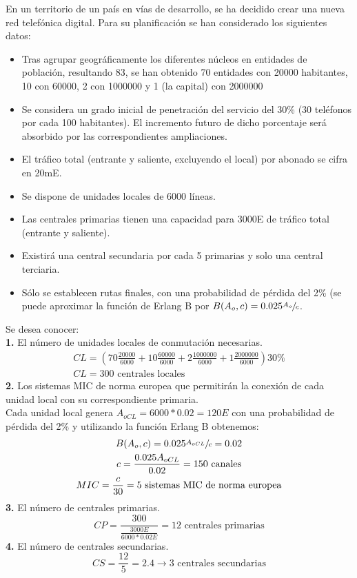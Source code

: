 \begin{exercise}[6]
En un territorio de un país en vías de desarrollo, se ha decidido crear una nueva red telefónica digital. Para su planificación se han considerado los siguientes datos:
\begin{itemize}
\item Tras agrupar geográficamente los diferentes núcleos en entidades de población, resultando 83, se han obtenido 70 entidades  con 20000 habitantes, 10 con 60000, 2 con 1000000 y 1 (la capital) con 2000000
\item Se considera un grado inicial de penetración del servicio del 30\% (30 teléfonos por cada 100 habitantes). El incremento futuro de dicho porcentaje será absorbido por las correspondientes ampliaciones.
\item El tráfico total (entrante y saliente, excluyendo el local) por abonado se cifra en 20mE.
\item Se dispone de unidades locales de 6000 líneas.
\item Las centrales primarias tienen una capacidad para 3000E de tráfico total (entrante y saliente).
\item Existirá una central secundaria por cada 5 primarias y solo una central terciaria.
\item Sólo se establecen rutas finales, con una probabilidad de pérdida del 2\% (se puede aproximar la función de Erlang B por $B(A_o,c)=0.025\sfrac{A_o}{c}$.
\end{itemize}
Se desea conocer:\\
\textbf{1.} El número de unidades locales de conmutación necesarias.\\
\begin{gather*}
CL=(70\frac{20000}{6000}+10\frac{60000}{6000}+2\frac{1000000}{6000}+1\frac{2000000}{6000})30\%\\
CL=300\text{ centrales locales}
\end{gather*}
\textbf{2.} Los sistemas MIC de norma europea que permitirán la conexión de cada unidad local con su correspondiente primaria.\\
Cada unidad local genera $A_{oCL}=6000*0.02=120E$ con una probabilidad de pérdida del 2\% y utilizando la función Erlang B obtenemos:
\begin{gather*}
B(A_o,c)=0.025\sfrac{A_{oCL}}{c}=0.02\\
c=\frac{0.025A_{oCL}}{0.02}=150\text{ canales}\\
MIC=\frac{c}{30}=5\text{ sistemas MIC de norma europea}
\end{gather*}
\textbf{3.} El número de centrales primarias.\\
\[CP=\frac{300}{\frac{3000E}{6000*0.02E}}=12\text{ centrales primarias}\]
\textbf{4.} El número de centrales secundarias.\\
\[CS=\frac{12}{5}=2.4\to 3\text{ centrales secundarias}\]
\end{exercise}

